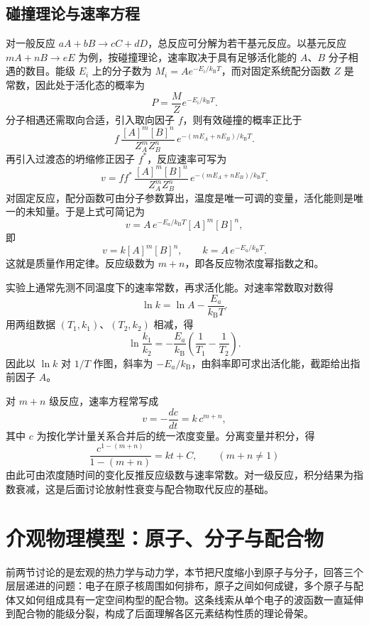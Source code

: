 \documentclass[UTF8]{ctexbook}
\begin{document}
\subsection{碰撞理论与速率方程}

对一般反应 $aA+bB\to cC+dD$，总反应可分解为若干基元反应。以基元反应 $mA+nB\to eE$ 为例，按碰撞理论，速率取决于具有足够活化能的 $A$、$B$ 分子相遇的数目。能级 $E_i$ 上的分子数为 $M_i=Ae^{-E_i/k_{\mathrm B}T}$，而对固定系统配分函数 $Z$ 是常数，因此处于活化态的概率为
\[
P=\frac{M}{Z}e^{-E_i/k_{\mathrm B}T}.
\]
分子相遇还需取向合适，引入取向因子 $f$，则有效碰撞的概率正比于
\[
f\,\frac{[A]^m[B]^n}{Z_A^mZ_B^n}\,
e^{-(mE_A+nE_B)/k_{\mathrm B}T}.
\]
再引入过渡态的坍缩修正因子 $f^*$，反应速率可写为
\[
v=ff^*\,\frac{[A]^m[B]^n}{Z_A^mZ_B^n}\,
e^{-(mE_A+nE_B)/k_{\mathrm B}T}.
\]
对固定反应，配分函数可由分子参数算出，温度是唯一可调的变量，活化能则是唯一的未知量。于是上式可简记为
\[
v=A\,e^{-E_a/k_{\mathrm B}T}[A]^m[B]^n,
\]
即
\[
v=k[A]^m[B]^n,\qquad
k=A\,e^{-E_a/k_{\mathrm B}T}.
\]
这就是质量作用定律。反应级数为 $m+n$，即各反应物浓度幂指数之和。

实验上通常先测不同温度下的速率常数，再求活化能。对速率常数取对数得
\[
\ln k=\ln A-\frac{E_a}{k_{\mathrm B}T}.
\]
用两组数据 $(T_1,k_1)$、$(T_2,k_2)$ 相减，得
\[
\ln\frac{k_1}{k_2}
=-\frac{E_a}{k_{\mathrm B}}\left(\frac{1}{T_1}-\frac{1}{T_2}\right).
\]
因此以 $\ln k$ 对 $1/T$ 作图，斜率为 $-E_a/k_{\mathrm B}$，由斜率即可求出活化能，截距给出指前因子 $A$。

对 $m+n$ 级反应，速率方程常写成
\[
v=-\frac{dc}{dt}=k\,c^{m+n},
\]
其中 $c$ 为按化学计量关系合并后的统一浓度变量。分离变量并积分，得
\[
\frac{c^{1-(m+n)}}{1-(m+n)}=kt+C,
\qquad (m+n\neq1)
\]
由此可由浓度随时间的变化反推反应级数与速率常数。对一级反应，积分结果为指数衰减，这是后面讨论放射性衰变与配合物取代反应的基础。

\newpage





\newpage
\section{介观物理模型：原子、分子与配合物}

前两节讨论的是宏观的热力学与动力学，本节把尺度缩小到原子与分子，回答三个层层递进的问题：电子在原子核周围如何排布，原子之间如何成键，多个原子与配体又如何组成具有一定空间构型的配合物。这条线索从单个电子的波函数一直延伸到配合物的能级分裂，构成了后面理解各区元素结构性质的理论骨架。
\end{document}
